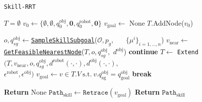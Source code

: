\begin{algorithm}[H]
\caption{\texttt{Skill-RRT}}\label{algo:Universal-skill-rrt}
\begin{algorithmic}[1]


\State $T=\emptyset$   
\State $v_{0} \gets \{\emptyset, \emptyset,  q^{\text{obj}}_{0},  \textbf{0},q^\text{robot}_0,  \textbf{0}\}$ 
\State $v_\text{goal} \gets $ None
\State $T$.AddNode($v_{0}$)

    \State ${o}, {q}^{\text{obj}}_{sg} \gets $\hyperref[algo:SampleSkillAndPose]{\texttt{SampleSkillSubgoal}}($\mathcal{O}, p_g, \ \ \ \ \ \ $
    \hspace*{18em}$ \{\mu^i\}_{i=1, \dots, n}$)
    \State ${v}_{\text{near}} \gets$ \hyperref[algo:NearestNode]{\texttt{GetFeasibleNearestNode}}($T, o, q^{\text{obj}}_{sg},$
    \hspace*{21.5em}$ d^\text{obj}$)
        \State \textbf{continue}
    \EndIf
    \State $T \leftarrow $ \texttt{Extend}$\big(T, v_{\text{near}}, o, q^{\text{obj}}_{sg}, d^\text{robot}(\cdot, \cdot), d^\text{obj}(\cdot, \cdot),$ \\
    \hspace*{19em} $ \epsilon^\text{robot}, \epsilon^\text{obj}\big)$
        \State $v_{\text{goal}} \gets v \in T.V \ \text{s.t.} \ v.q^{\text{obj}}_{\text{sg}} = q^{\text{obj}}_{\text{goal}}$
        \State \textbf{break}
    \EndIf
\EndFor

    \State \textbf{Return} None
\Else
    \State $\texttt{Path}_{\text{skill}} \gets \texttt{Retrace}(v_\text{goal}) $
    \State \textbf{Return} $\texttt{Path}_{\text{skill}}$
\EndIf
\EndProcedure

\Statex
\hrulefill


\end{algorithmic}
\end{algorithm}